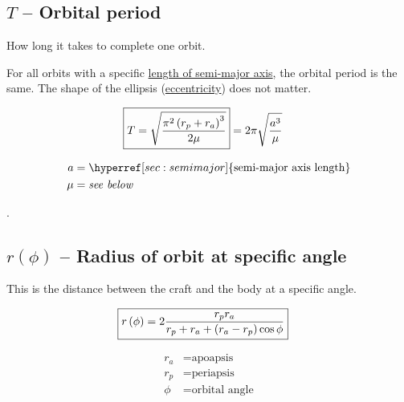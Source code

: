 \documentclass{article}
\begin{document}
\subsection{$T$ -- Orbital period}

How long it takes to complete one orbit.

For all orbits with a specific \hyperref[sec:semimajor]{length of semi-major axis}, the orbital period is the same. The shape of the ellipsis (\hyperref[sec:eccentricity]{eccentricity}) does not matter.

\begin{minipage}{0.5\textwidth}
    \begin{align}
        \Aboxed{& T =  \sqrt{\frac{ \pi^2 \left(r_p+r_a\right)^3 }{ 2\mu }}} = 2 \pi \sqrt{\frac{a^3}{\mu}}
    \end{align}
\end{minipage}\hfill
\begin{minipage}{0.35\textwidth}
    \begin{align*}
        a &= \hyperref[sec:semimajor]{\text{semi-major axis length}} \\
        \mu &= \text{\textit{see below}}
    \end{align*}
\end{minipage}

\bigskip

\cite{kspwiki:orbitmath}.

\subsection{$r\left(\phi\right)$ -- Radius of orbit at specific angle}

This is the distance between the craft and the body \cite{kspwiki:orbitmath} at a specific angle.

\begin{minipage}{0.6\textwidth}
    \begin{align}
        \Aboxed{r\left(\phi\right) = 2 \frac{r_p r_a}{r_p + r_a + (r_a - r_p)\cos{\phi}}}
    \end{align}
\end{minipage}\hfill
\begin{minipage}{0.35\textwidth}
    \begin{align*}
        r_a &= \text{apoapsis} \\
        r_p &= \text{periapsis} \\
        \phi &= \text{orbital angle}
    \end{align*}
\end{minipage}
\end{document}
